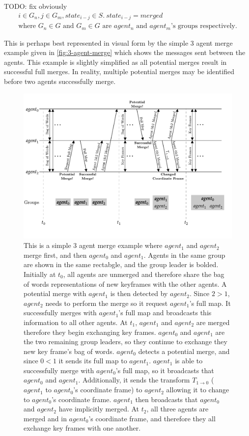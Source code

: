 TODO: fix obviously
\begin{gather} \label{eq:1}
    i \in G_n, j \in G_m, state_{i-j} \in S.\ state_{i-j} = merged\\ \text{where $G_n \in G$ and $G_m \in G$ are $agent_n$ and $agent_m$'s groups respectively.}
\end{gather}

This is perhaps best represented in visual form by the simple 3 agent merge example given in \autoref{fig:3-agent-merge} which shows the messages sent between the agents. This example is slightly simplified as all potential merges result in successful full merges. In reality, multiple potential merges may be identified before two agents successfully merge.

\begin{figure}[h]
    \centering
    \includegraphics[]{figures/3_agent_merge.pdf}

    \caption{This is a simple 3 agent merge example where $agent_1$ and $agent_2$ merge first, and then $agent_0$ and $agent_1$. Agents in the same group are shown in the same rectabgle, and the group leader is bolded. \captionbreak Initially at $t_0$, all agents are unmerged and therefore share the bag of words representations of new keyframes with the other agents. A potential merge with $agent_1$ is then detected by $agent_2$. Since $2>1$, $agent_2$ needs to perform the merge so it request $agent_1$'s full map. It successfully merges with $agent_1$'s full map and broadcasts this information to all other agents. \captionbreak At $t_1$, $agent_1$ and $agent_2$ are merged therefore they begin exchanging key frames. $agent_0$ and $agent_1$ are the two remaining group leaders, so they continue to exchange they new key frame's bag of words. $agent_0$ detects a potential merge, and since $0<1$ it sends its full map to $agent_1$. $agent_1$ is able to successfully merge with $agent_0$'s full map, so it broadcasts that $agent_0$ and $agent_1$. Additionally, it sends the transform $T_{1 \to 0}$ ($agent_1$ to $agent_0$'s coordinate frame) to $agent_2$ allowing it to change to $agent_0$'s coordinate frame. $agent_1$ then broadcasts that $agent_0$ and $agent_2$ have implicitly merged. \captionbreak At $t_2$, all three agents are merged and in $agent_0$'s coordinate frame, and therefore they all exchange key frames with one another.}
    \label{fig:3-agent-merge}
\end{figure}

